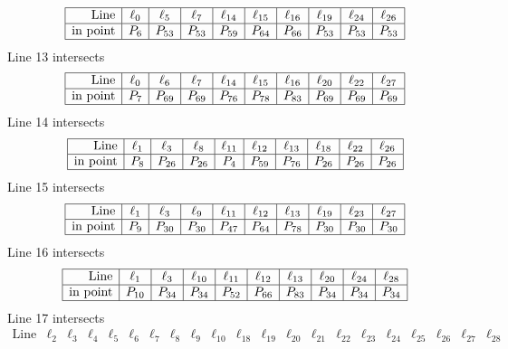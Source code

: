 \documentclass{article}
\begin{document}
{$$\begin{array}{|r*{9}{|c}|}
\hline
\mbox{Line}  & \ell_{0} & \ell_{5} & \ell_{7} & \ell_{14} & \ell_{15} & \ell_{16} & \ell_{19} & \ell_{24} & \ell_{26}\\
\hline
\mbox{in point}  & P_{6} & P_{53} & P_{53} & P_{59} & P_{64} & P_{66} & P_{53} & P_{53} & P_{53}\\
\hline
\end{array}
$$
Line 13 intersects 
$$
\begin{array}{|r*{9}{|c}|}
\hline
\mbox{Line}  & \ell_{0} & \ell_{6} & \ell_{7} & \ell_{14} & \ell_{15} & \ell_{16} & \ell_{20} & \ell_{22} & \ell_{27}\\
\hline
\mbox{in point}  & P_{7} & P_{69} & P_{69} & P_{76} & P_{78} & P_{83} & P_{69} & P_{69} & P_{69}\\
\hline
\end{array}
$$
Line 14 intersects 
$$
\begin{array}{|r*{9}{|c}|}
\hline
\mbox{Line}  & \ell_{1} & \ell_{3} & \ell_{8} & \ell_{11} & \ell_{12} & \ell_{13} & \ell_{18} & \ell_{22} & \ell_{26}\\
\hline
\mbox{in point}  & P_{8} & P_{26} & P_{26} & P_{4} & P_{59} & P_{76} & P_{26} & P_{26} & P_{26}\\
\hline
\end{array}
$$
Line 15 intersects 
$$
\begin{array}{|r*{9}{|c}|}
\hline
\mbox{Line}  & \ell_{1} & \ell_{3} & \ell_{9} & \ell_{11} & \ell_{12} & \ell_{13} & \ell_{19} & \ell_{23} & \ell_{27}\\
\hline
\mbox{in point}  & P_{9} & P_{30} & P_{30} & P_{47} & P_{64} & P_{78} & P_{30} & P_{30} & P_{30}\\
\hline
\end{array}
$$
Line 16 intersects 
$$
\begin{array}{|r*{9}{|c}|}
\hline
\mbox{Line}  & \ell_{1} & \ell_{3} & \ell_{10} & \ell_{11} & \ell_{12} & \ell_{13} & \ell_{20} & \ell_{24} & \ell_{28}\\
\hline
\mbox{in point}  & P_{10} & P_{34} & P_{34} & P_{52} & P_{66} & P_{83} & P_{34} & P_{34} & P_{34}\\
\hline
\end{array}
$$
Line 17 intersects 
$$
\begin{array}{|r*{20}{|c}|}
\hline
\mbox{Line}  & \ell_{2} & \ell_{3} & \ell_{4} & \ell_{5} & \ell_{6} & \ell_{7} & \ell_{8} & \ell_{9} & \ell_{10} & \ell_{18} & \ell_{19} & \ell_{20} & \ell_{21} & \ell_{22} & \ell_{23} & \ell_{24} & \ell_{25} & \ell_{26} & \ell_{27} & \ell_{28}\\

\end{array}$$}
\end{document}

